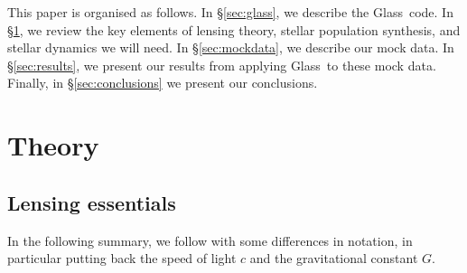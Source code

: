 \documentclass[galley,usenatbib]{mn2e}
\newcommand{\Glass}{{\sc Glass}}
\newcommand{\secref}[1] {\S\ref{#1}}
\begin{document}

This paper is organised as follows. In \secref{sec:glass}, we describe the \Glass\ code. In \secref{sec:theory}, we review
the key elements of lensing theory, stellar population synthesis, and stellar
dynamics we will need. In \secref{sec:mockdata}, we describe our mock data. In
\secref{sec:results}, we present our results from applying \Glass\ to these
mock data. Finally, in \secref{sec:conclusions} we present our conclusions. 

\section{Theory}\label{sec:theory}

\subsection{Lensing essentials}\label{sec:lensing_basic}

In the following summary, we follow \cite{1986ApJ...310..568B} with
some differences in notation, in particular putting back the
speed of light $c$ and the gravitational constant $G$.
\end{document}
